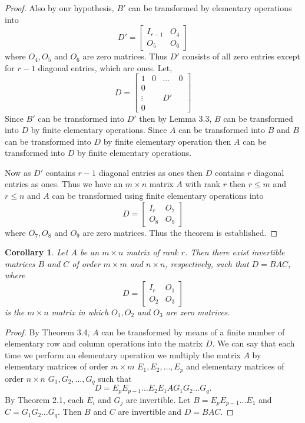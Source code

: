 \documentclass[12pt, a4paper]{article}
\newtheorem{corollary}{Corollary}[theorem]
\theoremstyle{definition}
\theoremstyle{remark}
\begin{document}
\begin{proof}
Also by our hypothesis, $B'$ can be transformed by elementary operations into
\[
D' = \begin{bmatrix} I_{r-1} & O_4 \\ O_5 & O_6 \end{bmatrix}
\]
where $O_4, O_5$ and $O_6$ are zero matrices. Thus $D'$ consists of all zero entries except for $r-1$ diagonal entries, which are ones. Let,
\[
D = \left[
\begin{array}{c|ccc}
1 & 0 & \dots & 0 \\ \hline
0 &   &       &   \\
\vdots & & D'    &   \\
0 &   &       &   
\end{array}
\right]
\]
Since $B'$ can be transformed into $D'$ then by Lemma 3.3, $B$ can be transformed into $D$ by finite elementary operations. Since $A$ can be transformed into $B$ and $B$ can be transformed into $D$ by finite elementary operation then $A$ can be transformed into $D$ by finite elementary operations.

Now as $D'$ contains $r-1$ diagonal entries as ones then $D$ contains $r$ diagonal entries as ones. Thus we have an $m \times n$ matrix $A$ with rank $r$ then $r \le m$ and $r \le n$ and $A$ can be transformed using finite elementary operations into
\[
D = \begin{bmatrix} I_r & O_7 \\ O_8 & O_9 \end{bmatrix}
\]
where $O_7, O_8$ and $O_9$ are zero matrices. Thus the theorem is established.
\end{proof}

\begin{corollary}
Let $A$ be an $m \times n$ matrix of rank $r$. Then there exist invertible matrices $B$ and $C$ of order $m \times m$ and $n \times n$, respectively, such that $D = BAC$, where
\[
D = \begin{bmatrix} I_r & O_1 \\ O_2 & O_3 \end{bmatrix}
\]
is the $m \times n$ matrix in which $O_1, O_2$ and $O_3$ are zero matrices.
\end{corollary}

\begin{proof}
By Theorem 3.4, $A$ can be transformed by means of a finite number of elementary row and column operations into the matrix $D$. We can say that each time we perform an elementary operation we multiply the matrix $A$ by elementary matrices of order $m \times m$ $E_1, E_2, \dots, E_p$ and elementary matrices of order $n \times n$ $G_1, G_2, \dots, G_q$ such that
\[
D = E_p E_{p-1} \dots E_2 E_1 A G_1 G_2 \dots G_q.
\]
By Theorem 2.1, each $E_i$ and $G_j$ are invertible. Let $B = E_p E_{p-1} \dots E_1$ and $C = G_1 G_2 \dots G_q$. Then $B$ and $C$ are invertible and $D = BAC$.
\end{proof}
\end{document}

